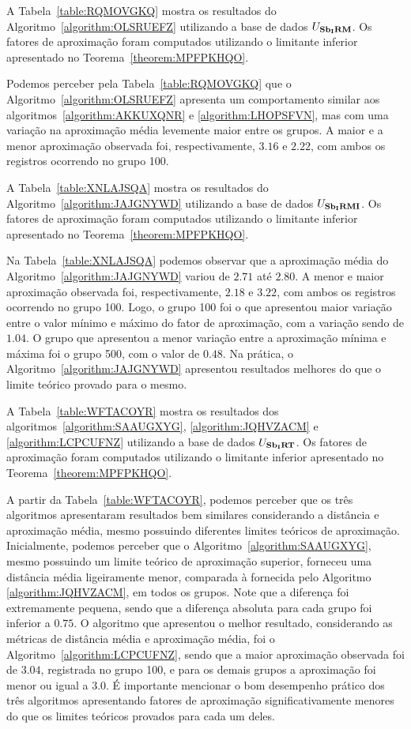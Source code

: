 A Tabela~\ref{table:RQMOVGKQ} mostra os resultados do Algoritmo~\ref{algorithm:OLSRUEFZ} utilizando a base de dados $U_{\textbf{Sb\textsubscript{I}RM}}{}$. Os fatores de aproximação foram computados utilizando o limitante inferior apresentado no Teorema~\ref{theorem:MPFPKHQO}.



Podemos perceber pela Tabela~\ref{table:RQMOVGKQ} que o Algoritmo~\ref{algorithm:OLSRUEFZ} apresenta um comportamento similar aos algoritmos~\ref{algorithm:AKKUXQNR} e \ref{algorithm:LHOPSFVN}, mas com uma variação na aproximação média levemente maior entre os grupos. A maior e a menor aproximação observada foi, respectivamente, $3.16$ e $2.22$, com ambos os registros ocorrendo no grupo 100.

A Tabela~\ref{table:XNLAJSQA} mostra os resultados do Algoritmo~\ref{algorithm:JAJGNYWD} utilizando a base de dados $U_{\textbf{Sb\textsubscript{I}RMI}}{}$. Os fatores de aproximação foram computados utilizando o limitante inferior apresentado no Teorema~\ref{theorem:MPFPKHQO}.



Na Tabela~\ref{table:XNLAJSQA} podemos observar que a aproximação média do Algoritmo~\ref{algorithm:JAJGNYWD} variou de $2.71$ até $2.80$. A menor e maior aproximação observada foi, respectivamente, $2.18$ e $3.22$, com ambos os registros ocorrendo no grupo 100. Logo, o grupo 100 foi o que apresentou maior variação entre o valor mínimo e máximo do fator de aproximação, com a variação sendo de $1.04$. O grupo que apresentou a menor variação entre a aproximação mínima e máxima foi o grupo 500, com o valor de $0.48$. Na prática, o Algoritmo~\ref{algorithm:JAJGNYWD} apresentou resultados melhores do que o limite teórico provado para o mesmo.

A Tabela~\ref{table:WFTACOYR} mostra os resultados dos algoritmos~\ref{algorithm:SAAUGXYG}, \ref{algorithm:JQHVZACM} e \ref{algorithm:LCPCUFNZ} utilizando a base de dados $U_{\textbf{Sb\textsubscript{I}RT}}{}$. Os fatores de aproximação foram computados utilizando o limitante inferior apresentado no Teorema~\ref{theorem:MPFPKHQO}.



A partir da Tabela~\ref{table:WFTACOYR}, podemos perceber que os três algoritmos apresentaram resultados bem similares considerando a distância e aproximação média, mesmo possuindo diferentes limites teóricos de aproximação. Inicialmente, podemos perceber que o Algoritmo~\ref{algorithm:SAAUGXYG}, mesmo possuindo um limite teórico de aproximação superior, forneceu uma distância média ligeiramente menor, comparada à fornecida pelo Algoritmo \ref{algorithm:JQHVZACM}, em todos os grupos. Note que a diferença foi extremamente pequena, sendo que a diferença absoluta para cada grupo foi inferior a $0.75$. O algoritmo que apresentou o melhor resultado, considerando as métricas de distância média e aproximação média, foi o Algoritmo~\ref{algorithm:LCPCUFNZ}, sendo que a maior aproximação observada foi de $3.04$, registrada no grupo 100, e para os demais grupos a aproximação foi menor ou igual a $3.0$. É importante mencionar o bom desempenho prático dos três algoritmos apresentando fatores de aproximação significativamente menores do que os limites teóricos provados para cada um deles.

